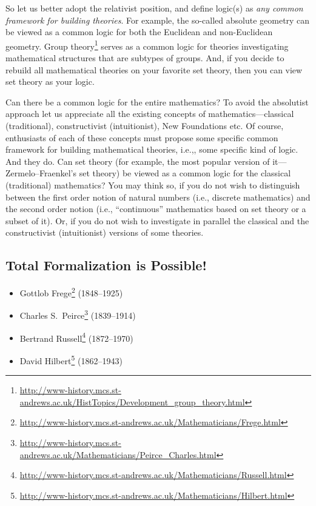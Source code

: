 So let us better adopt the relativist position, and define logic(s) as \emph{any common framework for building theories}.
For example, the so-called absolute geometry can be viewed as a common logic for both the Euclidean and non-Euclidean geometry.
Group theory\footnote{\url{http://www-history.mcs.st-andrews.ac.uk/HistTopics/Development\_group\_theory.html}} serves as a common logic for theories investigating mathematical structures that are subtypes of groups.
And, if you decide to rebuild all mathematical theories on your favorite set theory, then you can view set theory as your logic.

Can there be a common logic for the entire mathematics?
To avoid the absolutist approach let us appreciate all the existing concepts of mathematics---classical (traditional), constructivist (intuitionist), New Foundations etc.
Of course, enthusiasts of
each of these concepts must propose some specific common framework for building mathematical theories, i.e.,, some specific kind of logic.
And they do.
Can set theory (for example, the most popular version of it---Zermelo--Fraenkel's set theory) be viewed as a common logic for the classical (traditional) mathematics?
You may think so, if you do not wish to distinguish between the first order notion of natural numbers (i.e., discrete mathematics) and the second order notion (i.e., ``continuous'' mathematics based on set theory or a subset of it).
Or, if you do not wish to investigate in parallel the classical and the constructivist (intuitionist) versions of some theories.

\subsection{Total Formalization is Possible!}
\begin{itemize}
    \item Gottlob Frege\footnote{\url{http://www-history.mcs.st-andrews.ac.uk/Mathematicians/Frege.html}} (1848--1925)
    \item Charles S.\ Peirce\footnote{\url{http://www-history.mcs.st-andrews.ac.uk/Mathematicians/Peirce\_Charles.html}} (1839--1914)
    \item Bertrand Russell\footnote{\url{http://www-history.mcs.st-andrews.ac.uk/Mathematicians/Russell.html}} (1872--1970)
    \item David Hilbert\footnote{\url{http://www-history.mcs.st-andrews.ac.uk/Mathematicians/Hilbert.html}} (1862--1943)
\end{itemize}


